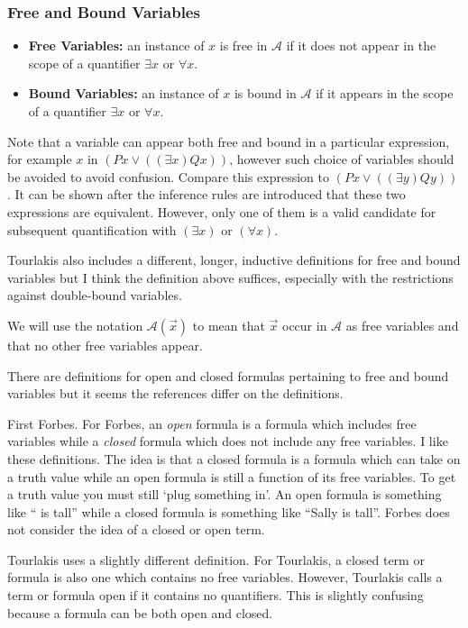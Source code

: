 \documentclass[12pt]{article}
\newcommand{\mc}[1]{\mathcal{#1}}
\begin{document}
\subsubsection*{Free and Bound Variables}
\begin{itemize}
\item{\textbf{Free Variables:} an instance of $x$ is free in $\mathcal{A}$ if it does not appear in the scope of a quantifier $\exists x$ or $\forall x$.}
\item{\textbf{Bound Variables:} an instance of $x$ is bound in $\mathcal{A}$ if it appears in the scope of a quantifier $\exists x$ or $\forall x$.}
\end{itemize}

\hrulefill

Note that a variable can appear both free and bound in a particular expression, for example $x$ in $(Px \lor ((\exists x)Qx))$, however such choice of variables should be avoided to avoid confusion. Compare this expression to $(Px \lor ((\exists y)Qy))$. It can be shown after the inference rules are introduced that these two expressions are equivalent. However, only one of them is a valid candidate for subsequent quantification with $(\exists x)$ or $(\forall x)$.

Tourlakis also includes a different, longer, inductive definitions for free and bound variables but I think the definition above suffices, especially with the restrictions against double-bound variables.

We will use the notation $\mc{A}(\vec{x})$ to mean that $\vec{x}$ occur in $\mc{A}$ as free variables and that no other free variables appear.

There are definitions for open and closed formulas pertaining to free and bound variables but it seems the references differ on the definitions.

First Forbes. For Forbes, an \textit{open} formula is a formula which includes free variables while a \textit{closed} formula which does not include any free variables. I like these definitions. The idea is that a closed formula is a formula which can take on a truth value while an open formula is still a function of its free variables. To get a truth value you must still `plug something in'. An open formula is something like ``\underline{\hspace{0.75cm}} is tall'' while a closed formula is something like ``Sally is tall''. Forbes does not consider the idea of a closed or open term.

Tourlakis uses a slightly different definition. For Tourlakis, a closed term or formula is also one which contains no free variables. However, Tourlakis calls a term or formula open if it contains no quantifiers. This is slightly confusing because a formula can be both open and closed. 
\end{document}
